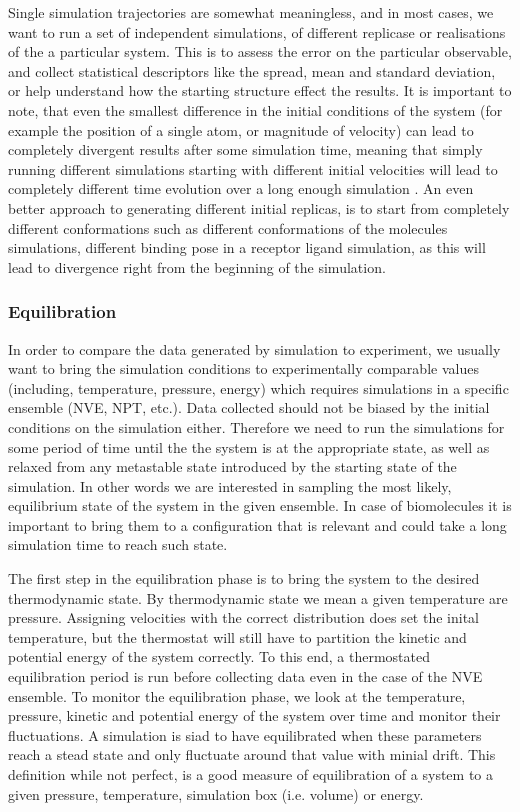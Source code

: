 Single simulation trajectories are somewhat meaningless, and in most cases, we want to run a set of independent simulations, of different replicase or realisations of the a particular system. This is to assess the error on the particular observable, and collect statistical descriptors like the spread, mean and standard deviation, or help understand how the starting structure effect the results. 
It is important to note, that even the smallest difference in the initial conditions of the system (for example the position of a single atom, or magnitude of velocity) can lead to completely divergent results after some simulation time, meaning that simply running different simulations starting with different initial velocities will lead to completely different time evolution over a long enough simulation \cite{allen2017computer}. An even better approach to generating different initial replicas, is to start from completely different conformations such as different conformations of the molecules simulations, different binding pose in a receptor ligand simulation, as this will lead to divergence right from the beginning of the simulation.

\subsubsection{Equilibration}

In order to compare the data generated by simulation to experiment, we usually want to bring the simulation conditions to experimentally comparable values (including, temperature, pressure, energy) which requires simulations in a specific ensemble (NVE, NPT, etc.). Data collected should not be biased by the initial conditions on the simulation either. Therefore we need to run the simulations for some period of time until the the system is at the appropriate state, as well as relaxed from any metastable state introduced by the starting state of the simulation. In other words we are interested in sampling the most likely, equilibrium state of the system in the given ensemble. In case of biomolecules it is important to bring them to a configuration that is relevant and could take a long simulation time to reach such state.

The first step in the equilibration phase is to bring the system to the desired thermodynamic state. By thermodynamic state we mean a given temperature are pressure. Assigning velocities with the correct distribution does set the inital temperature, but the thermostat will still have to partition the kinetic and potential energy of the system correctly. To this end, a thermostated equilibration period is run before collecting data even in the case of the NVE ensemble. To monitor the equilibration phase, we look at the temperature, pressure, kinetic and potential energy of the system over time and monitor their fluctuations. A simulation is siad to have equilibrated when these parameters reach a stead state and only fluctuate around that value with minial drift. This definition while not perfect, is a good measure of equilibration of a system to a given pressure, temperature, simulation box (i.e. volume) or energy.

